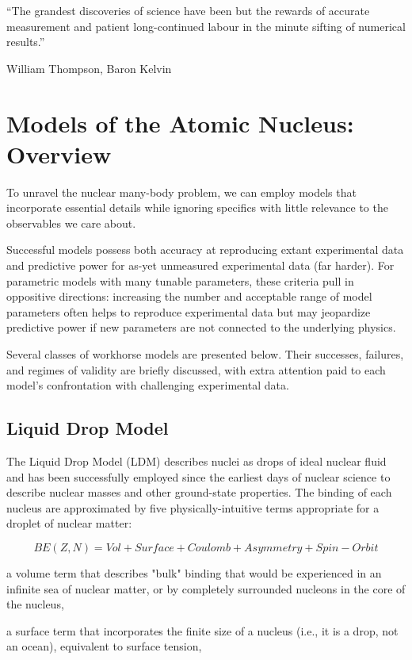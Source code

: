\epigraph{``The grandest discoveries of science have been but the rewards of
    accurate measurement and patient long-continued labour in the minute
sifting of numerical results.''}{William Thompson,  Baron Kelvin}

\section{Models of the Atomic Nucleus: Overview}

To unravel the nuclear many-body problem, we can
employ models that incorporate essential details while ignoring specifics with
little relevance to the observables we care about.

Successful models possess both accuracy at reproducing extant experimental data
and predictive power for as-yet unmeasured experimental data (far harder). For parametric models
with many tunable parameters, these criteria pull in oppositive directions: increasing the number
and acceptable range of model parameters often helps to reproduce experimental data but may
jeopardize predictive power if new parameters are not connected to the underlying physics.

Several classes of workhorse models are presented below. Their successes,
failures, and regimes of validity are briefly discussed, with extra attention paid
to each model's confrontation with challenging experimental data.

\subsection{Liquid Drop Model}

The Liquid Drop Model (LDM) describes nuclei as drops of ideal nuclear fluid and
has been successfully employed since the earliest days of nuclear science to
describe nuclear masses and other ground-state properties. The binding of each nucleus are
approximated by five physically-intuitive terms appropriate for a droplet of nuclear matter:

\begin{equation} \label{LDM}
    BE(Z, N) = Vol + Surface + Coulomb + Asymmetry + Spin-Orbit
\end{equation}

a volume term that describes "bulk" binding that would be experienced in an
infinite sea of nuclear matter, or by completely surrounded nucleons in the core of the nucleus,

a surface term that incorporates the finite size of a nucleus (i.e., it is a
drop, not an ocean), equivalent to surface tension,

